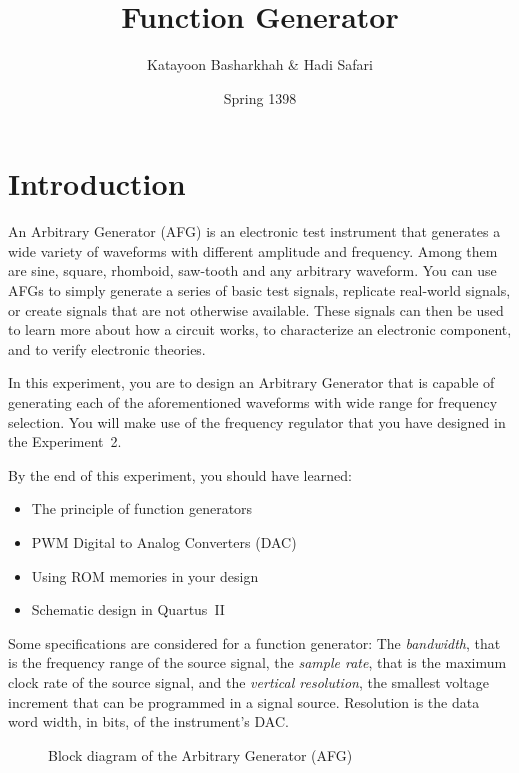 \documentclass[12pt, logo=tehranDLDL/ut]{tehranDLDL}
\title{Function Generator}
\author{Katayoon Basharkhah \& Hadi Safari}
\date{Spring 1398}
\begin{document}
\maketitle

\tableofcontents
\newpage

\section*{Introduction}

An Arbitrary Generator (AFG) is an electronic test instrument that generates a wide variety of waveforms with different amplitude and frequency. Among them are sine, square, rhomboid, saw-tooth and any arbitrary waveform. You can use AFGs to simply generate a series of basic test signals, replicate real-world signals, or create signals that are not otherwise available. These signals can then be used to learn more about how a circuit works, to characterize an electronic component, and to verify electronic theories.

In this experiment, you are to design an Arbitrary Generator that is capable of generating each of the aforementioned waveforms with wide range for frequency selection. You will make use of the frequency regulator that you have designed in the Experiment~2.

By the end of this experiment, you should have learned:

\begin{itemize}
    \item The principle of function generators
    \item PWM Digital to Analog Converters (DAC)
    \item Using ROM memories in your design
    \item Schematic design in Quartus~II
\end{itemize}

Some specifications are considered for a function generator:
The \textit{bandwidth}, that is the frequency range of the source signal,
the \textit{sample rate}, that is the maximum clock rate of the source signal,
and the \textit{vertical resolution}, the smallest voltage increment that can be programmed in a signal source.
Resolution is the data word width, in bits, of the instrument’s DAC.

\begin{figure}[b]
    \centering
    \caption{Block diagram of the Arbitrary Generator (AFG)\label{fig:AFGblockdia}}
    \resizebox{0.9\textwidth}{!}{}
\end{figure}
\end{document}
